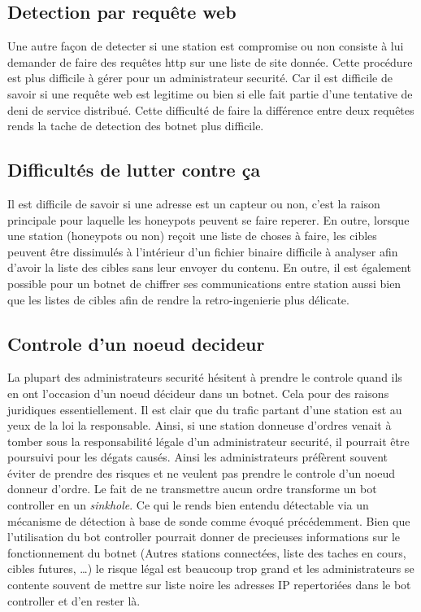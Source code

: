 \subsection{Detection par requête web}

Une autre façon de detecter si une station est compromise ou non consiste à lui demander de faire
des requêtes http sur une liste de site donnée. Cette procédure est plus difficile à gérer pour un administrateur
securité. Car il est difficile de savoir si une requête web est legitime ou bien si elle fait partie d'une tentative
de deni de service distribué. Cette difficulté de faire la différence entre deux requêtes rends
la tache de detection des botnet plus difficile.


\subsection{Difficultés de lutter contre ça}

Il est difficile de savoir si une adresse est un capteur ou non, c'est la raison principale pour laquelle
les honeypots peuvent se faire reperer.
En outre, lorsque une station (honeypots ou non) reçoit une liste de choses à faire, les cibles peuvent
être dissimulés à l'intérieur d'un fichier binaire difficile à analyser afin d'avoir la liste des cibles sans
leur envoyer du contenu. En outre, il est également possible pour un botnet de chiffrer ses communications entre
station aussi bien que les listes de cibles afin de rendre la retro-ingenierie plus délicate.

\subsection{Controle d'un noeud decideur}

La plupart des administrateurs securité hésitent à prendre le controle quand ils en ont l'occasion d'un
noeud décideur dans un botnet. Cela pour des raisons juridiques essentiellement. Il est clair que du trafic
partant d'une station est au yeux de la loi la responsable. Ainsi, si une station donneuse d'ordres venait à tomber
sous la responsabilité légale d'un administrateur securité, il pourrait être poursuivi pour les dégats causés.
Ainsi les administrateurs préfèrent souvent éviter de prendre des risques et ne veulent pas prendre le controle d'un
noeud donneur d'ordre. Le fait de ne transmettre aucun ordre transforme un bot controller en un \textit{sinkhole}.
Ce qui le rends bien entendu détectable via un mécanisme de détection à base de sonde comme évoqué précédemment.
Bien que l'utilisation du bot controller pourrait donner de precieuses informations sur le fonctionnement du botnet
(Autres stations connectées, liste des taches en cours, cibles futures, \ldots) le risque légal est beaucoup trop
grand et les administrateurs se contente souvent de mettre sur liste noire les adresses IP repertoriées dans le
bot controller et d'en rester là.
